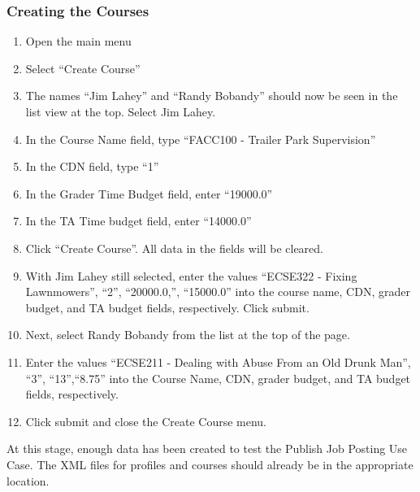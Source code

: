 \documentclass[12pt]{report}
\begin{document}
\subsubsection{Creating the Courses}
\begin{enumerate}
	\item Open the main menu
	\item Select ``Create Course''
	\item The names ``Jim Lahey'' and ``Randy Bobandy'' should now be seen in the list view at the
		top. Select Jim Lahey.
	\item In the Course Name field, type ``FACC100 - Trailer Park Supervision''
	\item In the CDN field, type ``1''
	\item In the Grader Time Budget field, enter ``19000.0''
	\item In the TA Time budget field, enter ``14000.0''
	\item Click ``Create Course''. All data in the fields will be cleared.
	\item With Jim Lahey still selected, enter the values ``ECSE322 - Fixing Lawnmowers'', ``2'',
		``20000.0,'', ``15000.0'' into the course name, CDN, grader budget, and TA budget fields,
		respectively. Click submit.
	\item Next, select Randy Bobandy from the list at the top of the page.
	\item Enter the values ``ECSE211 - Dealing with Abuse From an Old Drunk Man'', ``3'',
		``13'',``8.75'' into the Course Name, CDN, grader budget, and TA budget fields,
		respectively.
	\item Click submit and close the Create Course menu.
\end{enumerate}
At this stage, enough data has been created to test the Publish Job Posting Use Case. The XML files
for profiles and courses should already be in the appropriate location.
\end{document}

